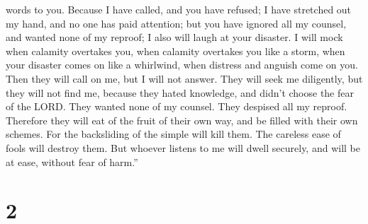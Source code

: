 words to you.  Because I have called, and you have
refused; I have stretched out my hand, and no one has paid attention;
 but you have ignored all my counsel, and wanted none of
my reproof;  I also will laugh at your disaster. I will
mock when calamity overtakes you,  when calamity
overtakes you like a storm, when your disaster comes on like a
whirlwind, when distress and anguish come on you.  Then
they will call on me, but I will not answer. They will seek me
diligently, but they will not find me,  because they
hated knowledge, and didn't choose the fear of the LORD. 
They wanted none of my counsel. They despised all my reproof.
 Therefore they will eat of the fruit of their own way,
and be filled with their own schemes.  For the
backsliding of the simple will kill them. The careless ease of fools
will destroy them.  But whoever listens to me will dwell
securely, and will be at ease, without fear of harm.''

\hypertarget{section-1}{%
\section{2}\label{section-1}}

